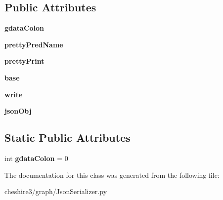 \subsection*{Public Attributes}
\begin{DoxyCompactItemize}
\item 
\hypertarget{classcheshire3_1_1graph_1_1_json_serializer_1_1_json_serializer_a3187e2bdc58c5cafe2853cffb9aba24b}{{\bfseries gdata\-Colon}}\label{classcheshire3_1_1graph_1_1_json_serializer_1_1_json_serializer_a3187e2bdc58c5cafe2853cffb9aba24b}

\item 
\hypertarget{classcheshire3_1_1graph_1_1_json_serializer_1_1_json_serializer_a26d3409757824b468e53219e61dd52b4}{{\bfseries pretty\-Pred\-Name}}\label{classcheshire3_1_1graph_1_1_json_serializer_1_1_json_serializer_a26d3409757824b468e53219e61dd52b4}

\item 
\hypertarget{classcheshire3_1_1graph_1_1_json_serializer_1_1_json_serializer_aa877640ef97b57f82da4f43f437f6d57}{{\bfseries pretty\-Print}}\label{classcheshire3_1_1graph_1_1_json_serializer_1_1_json_serializer_aa877640ef97b57f82da4f43f437f6d57}

\item 
\hypertarget{classcheshire3_1_1graph_1_1_json_serializer_1_1_json_serializer_ac1c1b841abcd14cb7429e8847f9cf390}{{\bfseries base}}\label{classcheshire3_1_1graph_1_1_json_serializer_1_1_json_serializer_ac1c1b841abcd14cb7429e8847f9cf390}

\item 
\hypertarget{classcheshire3_1_1graph_1_1_json_serializer_1_1_json_serializer_a9ee839ecea84a21b41bbf34449aefa44}{{\bfseries write}}\label{classcheshire3_1_1graph_1_1_json_serializer_1_1_json_serializer_a9ee839ecea84a21b41bbf34449aefa44}

\item 
\hypertarget{classcheshire3_1_1graph_1_1_json_serializer_1_1_json_serializer_aa5ab5d7b04c0d3721b158e2713c91271}{{\bfseries json\-Obj}}\label{classcheshire3_1_1graph_1_1_json_serializer_1_1_json_serializer_aa5ab5d7b04c0d3721b158e2713c91271}

\end{DoxyCompactItemize}
\subsection*{Static Public Attributes}
\begin{DoxyCompactItemize}
\item 
\hypertarget{classcheshire3_1_1graph_1_1_json_serializer_1_1_json_serializer_a8e2494ad5b8b89024ea10a38887b23b8}{int {\bfseries gdata\-Colon} = 0}\label{classcheshire3_1_1graph_1_1_json_serializer_1_1_json_serializer_a8e2494ad5b8b89024ea10a38887b23b8}

\end{DoxyCompactItemize}


The documentation for this class was generated from the following file\-:\begin{DoxyCompactItemize}
\item 
cheshire3/graph/Json\-Serializer.\-py\end{DoxyCompactItemize}
